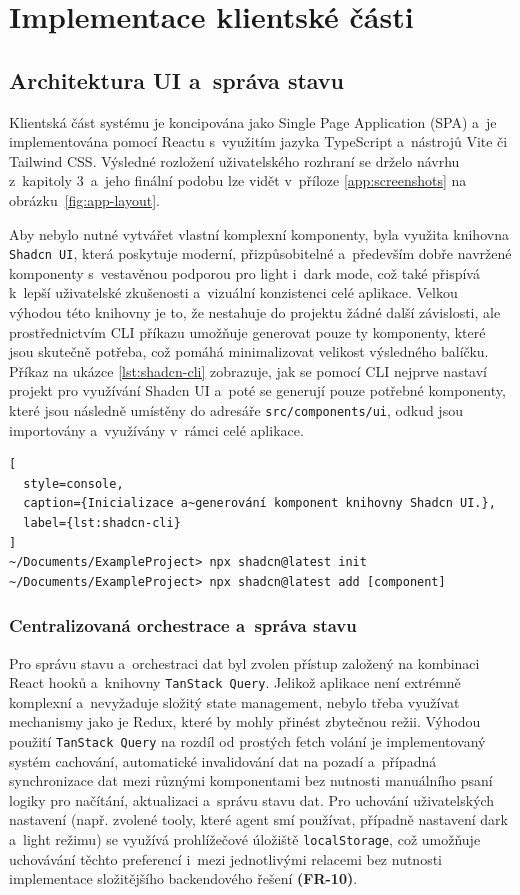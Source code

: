 \documentclass[czech, ing, kiv, he, iso690numb, viewonly]{fasthesis}
\begin{document}
\section{Implementace klientské části}

\subsection{Architektura UI a~správa stavu}

Klientská část systému je koncipována jako Single Page Application (SPA) a~je implementována pomocí 
Reactu s~využitím jazyka TypeScript a~nástrojů Vite či Tailwind CSS. Výsledné rozložení uživatelského rozhraní 
se drželo návrhu z~kapitoly 3~a~jeho finální podobu lze vidět v~příloze \ref{app:screenshots}
na obrázku~\ref{fig:app-layout}.

Aby nebylo nutné vytvářet vlastní komplexní komponenty, byla využita 
knihovna \texttt{Shadcn UI}, která poskytuje moderní, přizpůsobitelné a~především dobře navržené komponenty s~vestavěnou podporou pro light i~dark mode, což také přispívá k~lepší uživatelské zkušenosti a~vizuální konzistenci celé aplikace.
Velkou výhodou této knihovny je to, že nestahuje do projektu žádné další závislosti, ale prostřednictvím CLI příkazu umožňuje
generovat pouze ty komponenty, které jsou skutečně potřeba, což pomáhá minimalizovat velikost výsledného balíčku.
Příkaz na ukázce \ref{lst:shadcn-cli} zobrazuje, jak se pomocí CLI nejprve nastaví projekt pro využívání Shadcn UI a~poté se generují 
pouze potřebné komponenty, které jsou následně umístěny do adresáře \texttt{src/components/ui}, odkud jsou importovány a~využívány v~rámci celé aplikace.


\begin{lstlisting}[
  style=console,
  caption={Inicializace a~generování komponent knihovny Shadcn UI.},
  label={lst:shadcn-cli}
]
~/Documents/ExampleProject> npx shadcn@latest init
~/Documents/ExampleProject> npx shadcn@latest add [component]
\end{lstlisting}



\subsubsection*{Centralizovaná orchestrace a~správa stavu}

Pro správu stavu a~orchestraci dat byl zvolen přístup založený na kombinaci React hooků a~knihovny \texttt{TanStack Query}.
Jelikož aplikace není extrémně komplexní a~nevyžaduje složitý state management, nebylo třeba 
využívat mechanismy jako je Redux, které by mohly přinést zbytečnou režii.
Výhodou použití \texttt{TanStack Query} na rozdíl od prostých fetch volání je implementovaný systém cachování,
automatické invalidování dat na pozadí a~případná synchronizace dat mezi různými komponentami bez 
nutnosti manuálního psaní logiky pro načítání, aktualizaci a~správu stavu dat. 
Pro uchování uživatelských nastavení (např. zvolené tooly, které agent smí používat, případně nastavení dark a~light režimu) se využívá
prohlížečové úložiště \texttt{localStorage}, 
což umožňuje uchovávání těchto preferencí i~mezi jednotlivými relacemi bez nutnosti implementace složitějšího backendového řešení \textbf{(FR-10)}.
\end{document}
